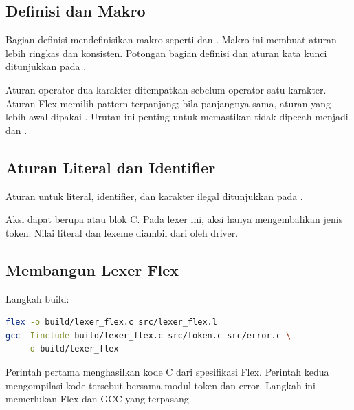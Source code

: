 \subsection{Definisi dan Makro}

Bagian definisi mendefinisikan makro seperti  dan
. Makro ini membuat aturan lebih ringkas dan konsisten.
Potongan bagian definisi dan aturan kata kunci ditunjukkan pada
.


Aturan operator dua karakter ditempatkan sebelum operator satu
karakter. Aturan Flex memilih pattern terpanjang; bila panjangnya
sama, aturan yang lebih awal dipakai \citep{thain2024}. Urutan ini penting untuk memastikan
\code{<=} tidak dipecah menjadi \code{<} dan \code{=}.

\subsection{Aturan Literal dan Identifier}

Aturan untuk literal, identifier, dan karakter ilegal ditunjukkan
pada .


Aksi dapat berupa  atau blok C. Pada lexer ini,
aksi hanya mengembalikan jenis token. Nilai literal dan lexeme
diambil dari  oleh driver.

\subsection{Membangun Lexer Flex}

Langkah build:
\begin{lstlisting}[language=bash]
flex -o build/lexer_flex.c src/lexer_flex.l
gcc -Iinclude build/lexer_flex.c src/token.c src/error.c \
    -o build/lexer_flex
\end{lstlisting}

Perintah pertama menghasilkan kode C dari spesifikasi Flex. Perintah
kedua mengompilasi kode tersebut bersama modul token dan error.
Langkah ini memerlukan Flex dan GCC yang terpasang.

